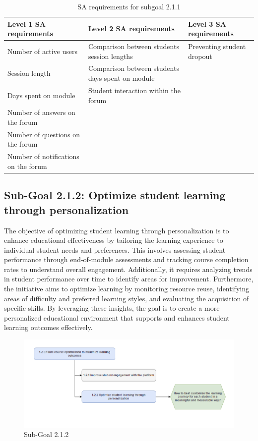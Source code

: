 \begin{table}[H]
\begin{center}
\begin{tabular}{ | m{5cm} | m{5cm}| m{5cm} | } 
  \hline
  \textbf{Level 1 SA requirements} & \textbf{Level 2 SA requirements}  & \textbf{Level 3 SA requirements}  \\ 
  \hline
  Number of active users &  Comparison between students session lengths & Preventing student dropout \\ 
  \hline
  Session length & Comparison between students days spent on module & \\ 
  \hline
  Days spent on module & Student interaction within the forum & \\
  \hline
  Number of answers on the forum &  & \\ 
  \hline
  Number of questions on the forum &  & \\ 
  \hline
  Number of notifications on the forum &  & \\ 
  \hline
\end{tabular}
\end{center}
\caption{SA requirements for subgoal 2.1.1}
\end{table}

\newpage
\subsection{Sub-Goal 2.1.2: Optimize student learning through personalization}
The objective of optimizing student learning through personalization is to enhance educational effectiveness by tailoring the learning experience to individual student needs and preferences. This involves assessing student performance through end-of-module assessments and tracking course completion rates to understand overall engagement. Additionally, it requires analyzing trends in student performance over time to identify areas for improvement. Furthermore, the initiative aims to optimize learning by monitoring resource reuse, identifying areas of difficulty and preferred learning styles, and evaluating the acquisition of specific skills. By leveraging these insights, the goal is to create a more personalized educational environment that supports and enhances student learning outcomes effectively.
\begin{figure}[H]
    \centering
    \includegraphics[width=\textwidth]{./assets/subgoal_1.2.2.png}
    \caption{Sub-Goal 2.1.2}
    \label{fig:subgoal1.2.2}
\end{figure}

